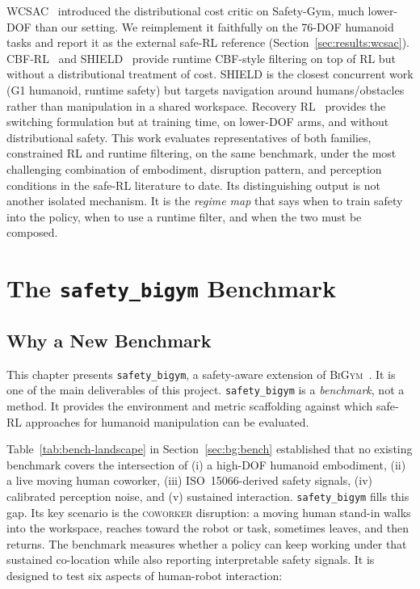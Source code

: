 \documentclass[11pt,a4paper]{report}
\newcommand{\iso}{ISO~15066}
\newcommand{\bigym}{\textsc{BiGym}}
\newcommand{\sbigym}{\texttt{safety\_bigym}}
\newcommand{\coworker}{\textsc{coworker}}
\begin{document}
WCSAC~\cite{yang2021wcsac} introduced the distributional cost
critic on Safety-Gym, much lower-DOF than our setting. We
reimplement it faithfully on the 76-DOF humanoid tasks and report it
as the external safe-RL reference
(Section~\ref{sec:results:wcsac}). CBF-RL~\cite{cbfrl2024} and
SHIELD~\cite{shield2025} provide runtime CBF-style filtering on top
of RL but without a distributional treatment of cost. SHIELD is the
closest concurrent work (G1 humanoid, runtime safety) but targets
navigation around humans/obstacles rather than manipulation in a
shared workspace. Recovery RL~\cite{thananjeyan2021recovery}
provides the switching formulation but at training time, on
lower-DOF arms, and without distributional safety. This work
evaluates representatives of both families, constrained RL and
runtime filtering, on the same benchmark, under the most challenging
combination of embodiment, disruption pattern, and perception
conditions in the safe-RL literature to date. Its distinguishing
output is not another isolated mechanism. It is the \emph{regime map}
that says when to train safety into the policy, when to use a runtime
filter, and when the two must be composed.

\chapter{The \texorpdfstring{\sbigym{}}{safety\_bigym} Benchmark}
\label{ch:benchmark-env}

\section{Why a New Benchmark}
\label{sec:bench:why}

This chapter presents \sbigym{}, a safety-aware extension of
\bigym{}~\cite{chernyadev2024bigym}. It is one of the main
deliverables of this project. \sbigym{} is a \emph{benchmark}, not a
method. It provides the environment and metric scaffolding against
which safe-RL approaches for humanoid manipulation can be evaluated.

Table~\ref{tab:bench-landscape} in Section~\ref{sec:bg:bench}
established that no existing benchmark covers the intersection of
(i) a high-DOF humanoid embodiment, (ii) a live moving human
coworker, (iii) \iso{}-derived safety signals, (iv) calibrated
perception noise, and (v) sustained interaction. \sbigym{} fills this
gap. Its key scenario is the \coworker{} disruption: a moving human
stand-in walks into the workspace, reaches toward the robot or task,
sometimes leaves, and then returns. The benchmark measures whether a
policy can keep working under that sustained co-location while also
reporting interpretable safety signals. It is designed to test six
aspects of human-robot interaction:
\end{document}
